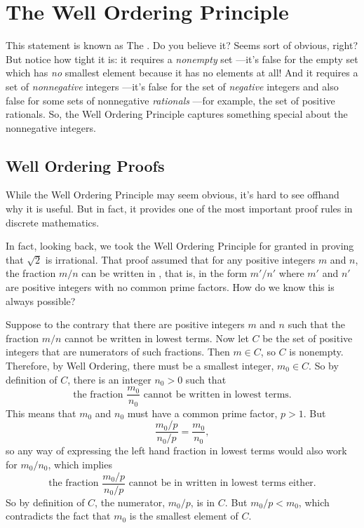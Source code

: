 \chapter{The Well Ordering Principle}\label{well_ordering_chap}


This statement is known as The .  Do you
believe it?  Seems sort of obvious, right?  But notice how tight it is: it
requires a \emph{nonempty} set ---it's false for the empty set which has
\emph{no} smallest element because it has no elements at all!  And it
requires a set of \emph{nonnegative} integers ---it's false for the set of
\emph{negative} integers and also false for some sets of nonnegative
\emph{rationals} ---for example, the set of positive rationals.  So, the
Well Ordering Principle captures something special about the nonnegative
integers.

\section{Well Ordering Proofs}

While the Well Ordering Principle may seem obvious, \iffalse it looks
nothing like the induction axiom, and\fi it's hard to see offhand why it
is useful.  But in fact, it provides one of the most important proof rules
in discrete mathematics.  \iffalse We'll explain this after we introduce a
template for well ordering principle proofs resembling the template in
Section~\ref{templ-induct-proofs} for a proof by strong induction.\fi

In fact, looking back, we took the Well Ordering Principle for granted
in proving that $\sqrt{2}$ is irrational.  That proof assumed that for
any positive integers $m$ and $n$, the fraction $m/n$ can be written
in , that is, in the form $m'/n'$ where $m'$ and
$n'$ are positive integers with no common prime factors.  How do we
know this is always possible?

Suppose to the contrary that there are positive integers $m$ and $n$
such that the fraction $m/n$ cannot be written in lowest terms.  Now
let $C$ be the set of positive integers that are numerators of such
fractions.  Then $m \in C$, so $C$ is nonempty.  Therefore, by Well
Ordering, there must be a smallest integer, $m_0 \in C$.  So by
definition of $C$, there is an integer $n_0 > 0$ such that
\[
\text{the fraction } \frac{m_0}{n_0} \text{ cannot be written in lowest
terms.}
\]
This means that $m_0$ and $n_0$ must have a common prime factor,
$p>1$.  But
\[
\frac{m_0/p}{n_0/p} = \frac{m_0}{n_0},
\]
so any way of expressing the left hand fraction in lowest terms would also
work for $m_0/n_0$, which implies
\[
\text{the fraction } \frac{m_0/p}{n_0/p} \text{ cannot be in written in
lowest terms either.}
\]
So by definition of $C$, the numerator, $m_0/p$, is in $C$.  But $m_0/p <
m_0$, which contradicts the fact that $m_0$ is the smallest element of $C$.

